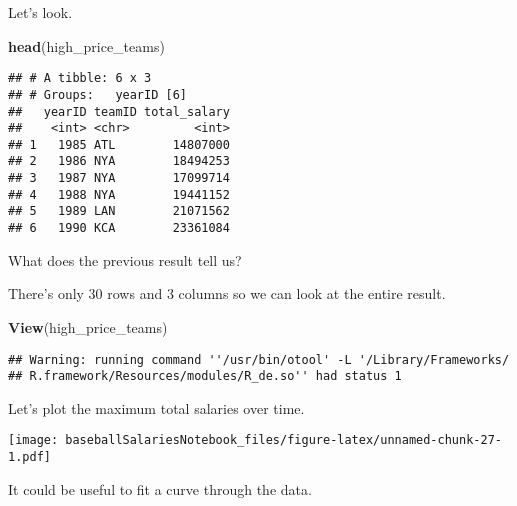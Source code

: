 \documentclass[]{article}
\newenvironment{Shaded}{\begin{snugshade}}{\end{snugshade}}
\newcommand{\KeywordTok}[1]{\textcolor[rgb]{0.13,0.29,0.53}{\textbf{#1}}}
\newcommand{\DataTypeTok}[1]{\textcolor[rgb]{0.13,0.29,0.53}{#1}}
\newcommand{\StringTok}[1]{\textcolor[rgb]{0.31,0.60,0.02}{#1}}
\newcommand{\OperatorTok}[1]{\textcolor[rgb]{0.81,0.36,0.00}{\textbf{#1}}}
\newcommand{\NormalTok}[1]{#1}
\begin{document}
Let's look.

\begin{Shaded}
\begin{Highlighting}[]
\KeywordTok{head}\NormalTok{(high_price_teams)}
\end{Highlighting}
\end{Shaded}

\begin{verbatim}
## # A tibble: 6 x 3
## # Groups:   yearID [6]
##   yearID teamID total_salary
##    <int> <chr>         <int>
## 1   1985 ATL        14807000
## 2   1986 NYA        18494253
## 3   1987 NYA        17099714
## 4   1988 NYA        19441152
## 5   1989 LAN        21071562
## 6   1990 KCA        23361084
\end{verbatim}

What does the previous result tell us?

There's only 30 rows and 3 columns so we can look at the entire result.

\begin{Shaded}
\begin{Highlighting}[]
\KeywordTok{View}\NormalTok{(high_price_teams)}
\end{Highlighting}
\end{Shaded}

\begin{verbatim}
## Warning: running command ''/usr/bin/otool' -L '/Library/Frameworks/
## R.framework/Resources/modules/R_de.so'' had status 1
\end{verbatim}

Let's plot the maximum total salaries over time.

\begin{Shaded}
\end{Shaded}

\texttt{[image: baseballSalariesNotebook\_files/figure-latex/unnamed-chunk-27-1.pdf]}

It could be useful to fit a curve through the data.

\begin{Shaded}
\end{Shaded}
\end{document}

